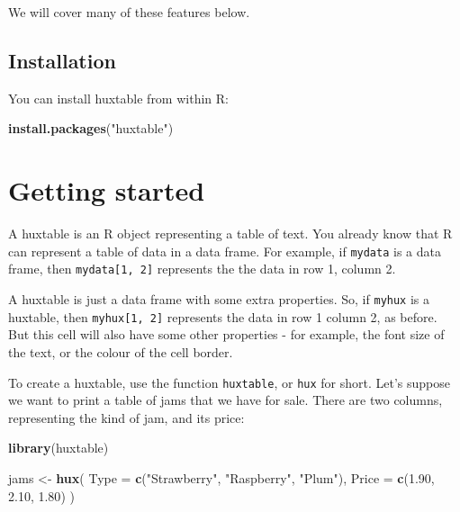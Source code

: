 \documentclass[]{article}
\newenvironment{Shaded}{\begin{snugshade}}{\end{snugshade}}
\newcommand{\DataTypeTok}[1]{\textcolor[rgb]{0.13,0.29,0.53}{#1}}
\newcommand{\FloatTok}[1]{\textcolor[rgb]{0.00,0.00,0.81}{#1}}
\newcommand{\KeywordTok}[1]{\textcolor[rgb]{0.13,0.29,0.53}{\textbf{#1}}}
\newcommand{\NormalTok}[1]{#1}
\newcommand{\StringTok}[1]{\textcolor[rgb]{0.31,0.60,0.02}{#1}}
\begin{document}
We will cover many of these features below.

\hypertarget{installation}{%
\subsection{Installation}\label{installation}}

You can install huxtable from within R:

\begin{Shaded}
\begin{Highlighting}[]
\KeywordTok{install.packages}\NormalTok{(}\StringTok{"huxtable"}\NormalTok{)}
\end{Highlighting}
\end{Shaded}

\FloatBarrier

\hypertarget{getting-started}{%
\section{Getting started}\label{getting-started}}

A huxtable is an R object representing a table of text. You already know
that R can represent a table of data in a data frame. For example, if
\texttt{mydata} is a data frame, then \texttt{mydata{[}1,\ 2{]}}
represents the the data in row 1, column 2.

A huxtable is just a data frame with some extra properties. So, if
\texttt{myhux} is a huxtable, then \texttt{myhux{[}1,\ 2{]}} represents
the data in row 1 column 2, as before. But this cell will also have some
other properties - for example, the font size of the text, or the colour
of the cell border.

To create a huxtable, use the function \texttt{huxtable}, or
\texttt{hux} for short. Let's suppose we want to print a table of jams
that we have for sale. There are two columns, representing the kind of
jam, and its price:

\begin{Shaded}
\begin{Highlighting}[]
\KeywordTok{library}\NormalTok{(huxtable)}
 
\NormalTok{jams <-}\StringTok{ }\KeywordTok{hux}\NormalTok{(}
        \DataTypeTok{Type  =} \KeywordTok{c}\NormalTok{(}\StringTok{"Strawberry"}\NormalTok{, }\StringTok{"Raspberry"}\NormalTok{, }\StringTok{"Plum"}\NormalTok{),}
        \DataTypeTok{Price =} \KeywordTok{c}\NormalTok{(}\FloatTok{1.90}\NormalTok{, }\FloatTok{2.10}\NormalTok{, }\FloatTok{1.80}\NormalTok{)}
\NormalTok{      )}
\end{Highlighting}
\end{Shaded}
\end{document}
